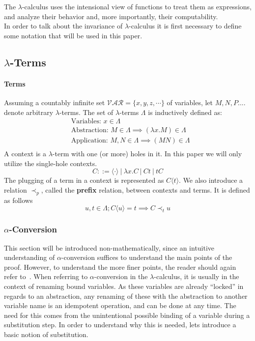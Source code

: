 \documentclass[11pt]{article}
\begin{document}
The $\lambda$-calculus uses the intensional view of functions to treat them as expressions, and analyze their behavior and, more importantly, their computability. \\
In order to talk about the invariance of $\lambda$-calculus it is first necessary to define some notation that will be used in this paper.
\subsection{$\lambda$-Terms}
\paragraph{Terms} Assuming a countably infinite set $\mathcal{VAR} = \{ x, y, z, \cdots \}$ of variables, let $M, N, P....$ denote arbitrary $\lambda$-terms. The set of $\lambda$-terms $\Lambda$ is inductively defined as:
\begin{equation*}
  \begin{split}
  & \text{Variables: } x \in \Lambda \\
  & \text{Abstraction: } M \in \Lambda \implies ( \lambda x.M ) \in \Lambda \\
  & \text{Application: } M, N \in \Lambda \implies (M N) \in \Lambda \\
  \end{split}
\end{equation*}
A context is a $\lambda$-term with one (or more) holes in it. In this paper we will only utilize the single-hole contexts.
\begin{equation*}
C ::= \langle \cdot \rangle \ | \ \lambda x.C \ | \ Ct \ | \ tC
\end{equation*}
The plugging of a term in a context is represented as $C\langle t \rangle$.
We also introduce a relation $\prec_p$, called the \textbf{prefix} relation, between contexts and terms. It is defined as follows
\begin{equation*}
  u,t \in \Lambda ; C \langle u \rangle = t \implies C \prec_t u
\end{equation*}
\subsubsection{$\alpha$-Conversion}
This section will be introduced non-mathematically, since an intuitive understanding of $\alpha$-conversion suffices to understand the main points of the proof. However, to understand the more finer points, the reader should again refer to~\cite{barendregt1984lambda}.
When referring to $\alpha$-conversion in the $\lambda$-calculus, it is usually in the context of renaming bound variables. As these variables are already \enquote{locked} in regards to an abstraction, any renaming of these with the abstraction to another variable name is an idempotent operation, and can be done at any time.
The need for this comes from the unintentional possible binding of a variable during a substitution step. In order to understand why this is needed, lets introduce a basic notion of substitution. 
\end{document}
